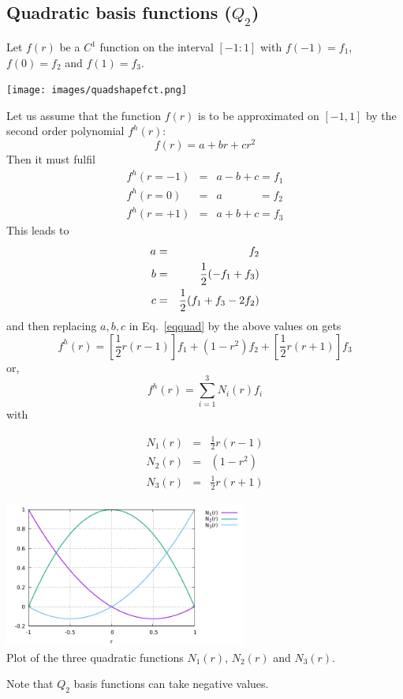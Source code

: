\newpage
\subsection{Quadratic basis functions ($Q_2$) \label{sec:bf2}}

Let $f(r)$ be a $C^1$ function on the interval $[-1:1]$ with $f(-1)=f_1$, $f(0)=f_2$ and $f(1)=f_3$.
\begin{center}
\texttt{[image: images/quadshapefct.png]}
\end{center}
Let us assume that the function $f(r)$ is to be approximated on $[-1,1]$ by the second order polynomial 
$f^h(r)$:
\begin{equation}
f(r)=a+br+cr^2 \label{eqquad}
\end{equation}
Then it must fulfil
\begin{eqnarray}
f^h(r=-1)&=&a-b+c = f_1 \nonumber\\
f^h(r=0) &=&a\quad\quad\quad\;     = f_2 \nonumber\\
f^h(r=+1)&=&a+b+c = f_3 \nonumber
\end{eqnarray}
This leads to
\begin{eqnarray}
a&=&f_2   \nonumber\\
b&=&\frac{1}{2}(-f_1+f_3)  \nonumber\\
c&=&\frac{1}{2}(f_1+f_3-2f_2) 
\end{eqnarray}
and then replacing $a,b,c$ in Eq.~\eqref{eqquad} by the above values on gets
\[
f^h(r)=\left[\frac{1}{2}r(r-1)\right] f_1 + (1-r^2) f_2 + \left[\frac{1}{2}r(r+1)\right] f_3
\]
or,
\[
\boxed{
f^h(r) = \sum_{i=1}^3 N_i(r) f_i
}
\]
with
\begin{mdframed}[backgroundcolor=blue!5]
\begin{eqnarray}
N_1(r) &=& \frac{1}{2}r(r-1) \nonumber\\
N_2(r) &=& (1-r^2) \nonumber\\ 
N_3(r) &=& \frac{1}{2}r(r+1) 
\end{eqnarray}
\end{mdframed}

\begin{center}
\includegraphics[width=8cm]{images/basis1D/quadratic.pdf}\\
{\captionfont Plot of the three quadratic functions $N_1(r)$, $N_2(r)$ and $N_3(r)$.}
\end{center}
Note that $Q_2$ basis functions can take negative values. 

